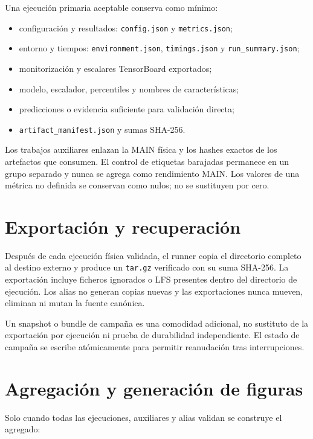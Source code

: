 Una ejecución primaria aceptable conserva como mínimo:

\begin{itemize}[leftmargin=*]
    \item configuración y resultados: \texttt{config.json} y \texttt{metrics.json};
    \item entorno y tiempos: \texttt{environment.json}, \texttt{timings.json} y \texttt{run\_summary.json};
    \item monitorización y escalares TensorBoard exportados;
    \item modelo, escalador, percentiles y nombres de características;
    \item predicciones o evidencia suficiente para validación directa;
    \item \texttt{artifact\_manifest.json} y sumas SHA-256.
\end{itemize}

Los trabajos auxiliares enlazan la MAIN física y los hashes exactos de los artefactos que consumen. El control de etiquetas barajadas permanece en un grupo separado y nunca se agrega como rendimiento MAIN. Los valores de una métrica no definida se conservan como nulos; no se sustituyen por cero.

\section{Exportación y recuperación}

Después de cada ejecución física validada, el runner copia el directorio completo al destino externo y produce un \texttt{tar.gz} verificado con su suma SHA-256. La exportación incluye ficheros ignorados o LFS presentes dentro del directorio de ejecución. Los alias no generan copias nuevas y las exportaciones nunca mueven, eliminan ni mutan la fuente canónica.

Un snapshot o bundle de campaña es una comodidad adicional, no sustituto de la exportación por ejecución ni prueba de durabilidad independiente. El estado de campaña se escribe atómicamente para permitir reanudación tras interrupciones.

\section{Agregación y generación de figuras}

Solo cuando todas las ejecuciones, auxiliares y alias validan se construye el agregado:


